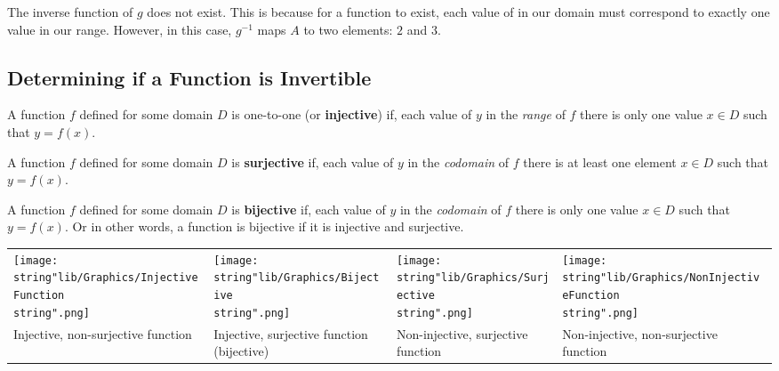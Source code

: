 \documentclass[11pt,a4paper]{book}
\begin{document}
The inverse function of $g$ does not exist. This is because for a
function to exist, each value of in our domain must correspond to
exactly one value in our range. However, in this case, $g^{-1}$ maps
$A$ to two elements: $2$ and $3$.

\newpage

\subsection{Determining if a Function is Invertible}

\begin{tcolorbox}[colback=blue!5, colframe=black,boxrule=.4pt, sharpish corners]

A function $f$ defined for some domain $D$ is one-to-one (or \textbf{injective}) if, each value of $y$ in the \textit{range} of $f$ there is only one value $x\in D$ such that $y=f\left(x\right)$.
\end{tcolorbox}

\medskip{}

\begin{tcolorbox}[colback=blue!5, colframe=black,boxrule=.4pt, sharpish corners]

A function $f$ defined for some domain $D$ is \textbf{surjective} if, each value of $y$ in the \textit{codomain} of $f$ there is at least one element $x\in D$ such that $y=f\left(x\right)$.
\end{tcolorbox}

\medskip{}

\begin{tcolorbox}[colback=blue!5, colframe=black,boxrule=.4pt, sharpish corners]

A function $f$ defined for some domain $D$ is \textbf{bijective} if, each value of $y$ in the \textit{codomain} of $f$ there is only one value $x\in D$ such that $y=f\left(x\right)$. Or in other words,
a function is bijective if it is injective and surjective.
\end{tcolorbox}

\bigskip{}


\begin{tabular}{>{\centering}p{3.6cm}>{\centering}p{3.6cm}>{\centering}p{3.6cm}>{\centering}p{3.6cm}}
\texttt{[image: \\string"lib/Graphics/InjectiveFunction\\string".png]} & \texttt{[image: \\string"lib/Graphics/Bijective\\string".png]} & \texttt{[image: \\string"lib/Graphics/Surjective\\string".png]} & \texttt{[image: \\string"lib/Graphics/NonInjectiveFunction\\string".png]}\tabularnewline
Injective, non-surjective function & Injective, surjective function (bijective) & Non-injective, surjective function & Non-injective, non-surjective function\tabularnewline
\end{tabular}
\end{document}

